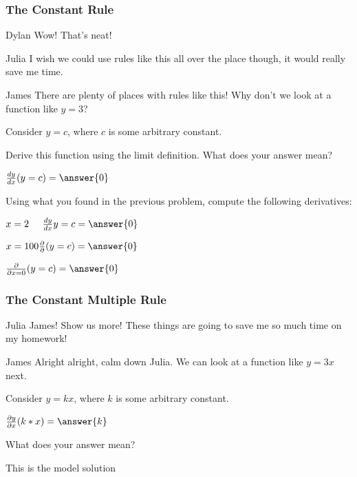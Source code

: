 \documentclass{ximera}
\begin{document}
\subsubsection{The Constant Rule}
\begin{dialogue}
\item[Dylan] Wow! That's neat!
\item[Julia] I wish we could use rules like this all over the place though, it would really save me time.
\item[James] There are plenty of places with rules like this! Why don't we look at a function like $y = 3$?
\end{dialogue}

Consider $y = c$, where $c$ is some arbitrary constant.
\begin{question}
Derive this function using the limit definition. What does your answer mean?

$ \frac{dy}{dx} (y=c) =  \answer{0}$
\begin{freeResponse}
\end{freeResponse}
\end{question}

\begin{question}
Using what you found in the previous problem, compute the following derivatives:

$ x = 2 \hspace{5mm} \frac{dy}{dx} y=c =  \answer{0}$

$ x = 100 \frac{\partial}{\partial}(y=c) =  \answer{0}$

$ \frac{\partial}{\partial x=0}(y=c) =  \answer{0}$
\end{question}

\subsubsection{The Constant Multiple Rule}
\begin{dialogue}
\item[Julia] James! Show us more! These things are going to save me so much time on my homework!
\item[James] Alright alright, calm down Julia. We can look at a function like $y = 3x$ next.
\end{dialogue}

Consider $y = kx$, where $k$ is some arbitrary constant.
\begin{question}
$ \frac{\partial y}{\partial x} (k*x) =  \answer{k}$
\item{What does your answer mean?}
\begin{freeResponse}
This is the model solution %
\end{freeResponse}
\end{question}
\end{document}
